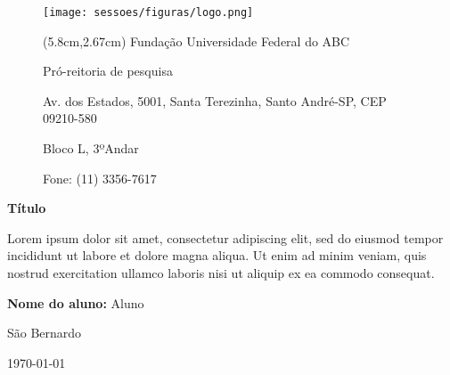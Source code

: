\begin{figure}
    \texttt{[image: sessoes/figuras/logo.png]}
    \label{fig:ufabc}
        
    \begin{textblock*}{12cm}(5.8cm,2.67cm) %
        \small
        \singlespacing
        Fundação Universidade Federal do ABC
            
        Pró-reitoria de pesquisa
            
        Av. dos Estados, 5001, Santa Terezinha, Santo André-SP, CEP 09210-580
            
        Bloco L, 3ºAndar
        
        Fone: (11) 3356-7617
    \end{textblock*}
    \vspace{4cm}
\end{figure}
   
\begin{center}
    \huge \textbf{Título} \vspace{0.5cm}
\end{center}

\begin{changemargin}{10cm}{0cm}
    \vspace{3.5cm}
    \noindent Lorem ipsum dolor sit amet, consectetur adipiscing elit, sed do eiusmod tempor incididunt ut labore et dolore magna aliqua. Ut enim ad minim veniam, quis nostrud exercitation ullamco laboris nisi ut aliquip ex ea commodo consequat. 
    \vspace{5cm}
\end{changemargin}

\begin{onehalfspace}
\noindent
\textbf{Nome do aluno:} Aluno \\
\end{onehalfspace}
\begin{center}
    \onehalfspacing
    São Bernardo

    \today
\end{center}

\date{\vspace{-2cm}} %